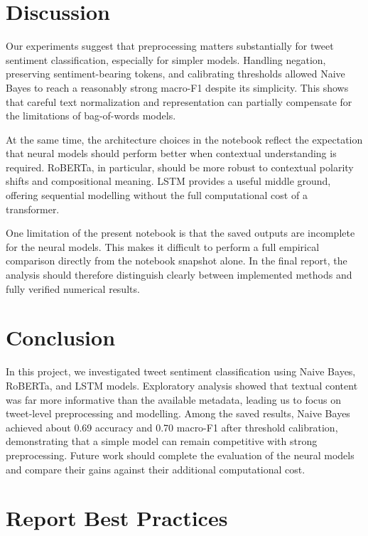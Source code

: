 \documentclass[11pt]{article}
\begin{document}
\section{Discussion}

Our experiments suggest that preprocessing matters substantially for tweet sentiment classification, especially for simpler models. Handling negation, preserving sentiment-bearing tokens, and calibrating thresholds allowed Naive Bayes to reach a reasonably strong macro-F1 despite its simplicity. This shows that careful text normalization and representation can partially compensate for the limitations of bag-of-words models.

At the same time, the architecture choices in the notebook reflect the expectation that neural models should perform better when contextual understanding is required. RoBERTa, in particular, should be more robust to contextual polarity shifts and compositional meaning. LSTM provides a useful middle ground, offering sequential modelling without the full computational cost of a transformer.

One limitation of the present notebook is that the saved outputs are incomplete for the neural models. This makes it difficult to perform a full empirical comparison directly from the notebook snapshot alone. In the final report, the analysis should therefore distinguish clearly between implemented methods and fully verified numerical results.

\section{Conclusion}

In this project, we investigated tweet sentiment classification using Naive Bayes, RoBERTa, and LSTM models. Exploratory analysis showed that textual content was far more informative than the available metadata, leading us to focus on tweet-level preprocessing and modelling. Among the saved results, Naive Bayes achieved about 0.69 accuracy and 0.70 macro-F1 after threshold calibration, demonstrating that a simple model can remain competitive with strong preprocessing. Future work should complete the evaluation of the neural models and compare their gains against their additional computational cost.



\section{Report Best Practices}
\label{s:best}
\end{document}
